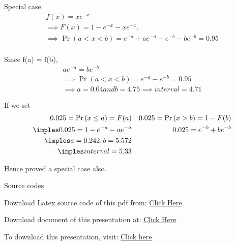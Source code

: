 \documentclass{beamer}
\providecommand{\pr}[1]{\ensuremath{\Pr\left(#1\right)}}
\numberwithin{equation}{subsection}
\begin{document}
\begin{frame}{}
    \begin{alertblock}{Special case}
        \begin{align}
            f(x) = xe^{-x}\\
            \implies F(x) = 1-e^{-x}-xe^{-x}.\\
            \implies \pr{a < x < b} = e^{-a} + ae^{-a} - e^{-b} - be^{-b} = 0.95\\
        \end{align}
        \end{alertblock}
        \end{frame}

\begin{frame}{}
\begin{alertblock}
        Since f(a) = f(b), 
    \begin{align}
        ae^{-a} = be^{-b}\\
        \implies \pr{a < x < b} = e^{-a} - e^{-b} = 0.95\\
        \implies a = 0.04 and b = 4.75
        \implies interval = 4.71
    \end{align}
        
        If we set 
    \begin{align}
        0.025 = \pr{x \le a} = F(a) && 0.025 = \pr{x > b} = 1 - F(b)\\
        \imples 0.025 = 1 - e^{-a}-ae^{-a} && 0.025 = e^{-b} + be^{-b}\\
        \imples a = 0.242, b = 5.572\\
        \imples interval = 5.33
    \end{align}
    \end{alertblock}
    Hence proved a special case also.
\end{frame}

\begin{frame}{Source codes}
    \begin{block}{Download Latex source code of this pdf from:}
       \href{https://github.com/TushitaSharva/PRV_2022/blob/main/ASSIGNMENT_7/mainBeamer.tex}{Click Here}
    \end{block}
    
    \begin{block}{Download document of this presentation at:}
       \href{https://github.com/TushitaSharva/PRV_2022/blob/main/ASSIGNMENT_7/mainDoc.pdf}{Click Here}
    \end{block}
    
    \begin{block}{To download this presentation, visit:}
        \href{https://github.com/TushitaSharva/PRV_2022/blob/main/ASSIGNMENT_7/mainBeamer.pdf}{Click here}
    \end{block}
    
\end{frame}
\end{document}
